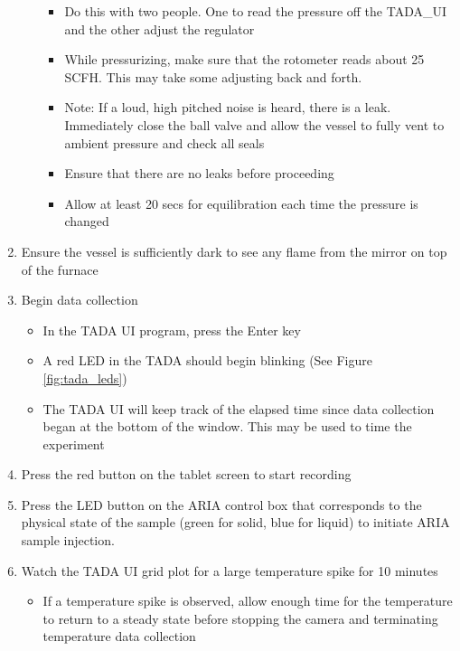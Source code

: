 \documentclass[letterpaper,11pt]{article}
\begin{document}
\begin{enumerate}
\begin{itemize}
        \begin{itemize}
            \item Do this with two people. One to read the pressure off the TADA\_UI and the other
                adjust the regulator
            \item While pressurizing, make sure that the rotometer reads about 
                25 SCFH. This may take some adjusting back and forth.
            \item Note: If a loud, high pitched noise is heard, there is a 
                leak. Immediately close the ball valve and allow the vessel to 
                fully vent to ambient pressure and check all seals
            \item Ensure that there are no leaks before proceeding
			\item Allow at least 20 secs for equilibration each time the pressure 
				is changed
            \end{itemize}
        \end{itemize} 

    \item Ensure the vessel is sufficiently dark to see any 
        flame from the mirror on top of the furnace
    
    \item Begin data collection 
        \begin{itemize}
        \item In the TADA UI program, press the Enter key
        \item A red LED in the TADA should begin blinking (See 
            Figure \ref{fig:tada_leds})
        \item The TADA UI will keep track of the elapsed time since data 
          collection began at the bottom of the window. This may be used
          to time the experiment
        \end{itemize}
    
    \item Press the red button on the tablet 
        screen to start recording
        
    \item Press the LED button on the ARIA control box that corresponds to the 
        physical state of the sample
        (green for solid, blue for liquid) to initiate ARIA sample injection.
            
    \item Watch the TADA UI grid plot for a large temperature spike for 10 minutes
        \begin{itemize}
        \item If a temperature spike is observed, allow enough time for the
            temperature to return to a steady state before stopping the camera 
            and terminating temperature data collection
        

\end{itemize}
\end{enumerate}
\end{document}
